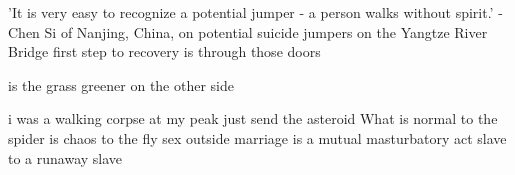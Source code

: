 'It is very easy to recognize a potential jumper - a person walks without spirit.' - Chen Si of Nanjing, China, on potential suicide jumpers on the Yangtze River Bridge
first step to recovery is through those doors

is the grass greener on the other side

i was a walking corpse at my peak
just send the asteroid
What is normal to the spider is chaos to the fly
sex outside marriage is a mutual masturbatory act
slave to a runaway slave

